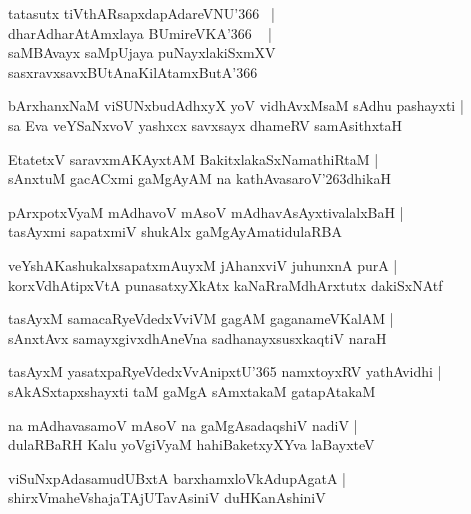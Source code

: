 \documentclass[twoside,12pt,openright]{book}
\def\S{\char'263}
\newcounter{shloka}[chapter]
\begin{document}
\begin{shloka}%
tatasutx tiVthARsapxdapAdareVNU\char'366 ~|\\
dharAdharAtAmxlaya BUmireVKA\char'366 ~ |\\
saMBAvayx saMpUjaya puNayxlakiSxmXV \\
sasxravxsavxBUtAnaKilAtamxButA\char'366 
\end{shloka}

\begin{shloka}%
bArxhanxNaM viSUNxbudAdhxyX yoV vidhAvxMsaM sAdhu pashayxti |\\
sa Eva veYSaNxvoV yashxcx savxsayx dhameRV samAsithxtaH 
\end{shloka}

\begin{shloka}%
EtatetxV saravxmAKAyxtAM BakitxlakaSxNamathiRtaM |\\
sAnxtuM gacACxmi gaMgAyAM na kathAvasaroV\S dhikaH 
\end{shloka}

\begin{shloka}%
pArxpotxVyaM mAdhavoV mAsoV mAdhavAsAyxtivalalxBaH |\\
tasAyxmi sapatxmiV shukAlx gaMgAyAmatidulaRBA
\end{shloka}

\begin{shloka}%
veYshAKashukalxsapatxmAuyxM jAhanxviV juhunxnA purA |\\
korxVdhAtipxVtA punasatxyXkAtx kaNaRraMdhArxtutx dakiSxNAtf 
\end{shloka}

\begin{shloka}%
tasAyxM samacaRyeVdedxVviVM gagAM gaganameVKalAM |\\
sAnxtAvx samayxgivxdhAneVna sadhanayxsusxkaqtiV naraH 
\end{shloka}

\begin{shloka}%
tasAyxM yasatxpaRyeVdedxVvAnipxtU\char'365 namxtoyxRV yathAvidhi |\\
sAkASxtapxshayxti taM gaMgA sAmxtakaM gatapAtakaM 
\end{shloka}

\begin{shloka}%
na mAdhavasamoV mAsoV na gaMgAsadaqshiV nadiV |\\
dulaRBaRH Kalu yoVgiVyaM hahiBaketxyXYva laBayxteV 
\end{shloka}

\begin{shloka}%
viSuNxpAdasamudUBxtA barxhamxloVkAdupAgatA |\\
shirxVmaheVshajaTAjUTavAsiniV duHKanAshiniV 
\end{shloka}
\end{document}
